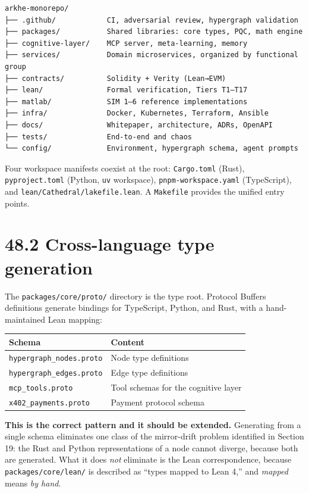 \documentclass[
  11pt]{report}
\begin{document}
\begin{verbatim}
arkhe-monorepo/
├── .github/            CI, adversarial review, hypergraph validation
├── packages/           Shared libraries: core types, PQC, math engine
├── cognitive-layer/    MCP server, meta-learning, memory
├── services/           Domain microservices, organized by functional group
├── contracts/          Solidity + Verity (Lean→EVM)
├── lean/               Formal verification, Tiers T1–T17
├── matlab/             SIM 1–6 reference implementations
├── infra/              Docker, Kubernetes, Terraform, Ansible
├── docs/               Whitepaper, architecture, ADRs, OpenAPI
├── tests/              End-to-end and chaos
└── config/             Environment, hypergraph schema, agent prompts
\end{verbatim}

Four workspace manifests coexist at the root: \texttt{Cargo.toml}
(Rust), \texttt{pyproject.toml} (Python, \texttt{uv} workspace),
\texttt{pnpm-workspace.yaml} (TypeScript), and
\texttt{lean/Cathedral/lakefile.lean}. A \texttt{Makefile} provides the
unified entry points.

\hypertarget{cross-language-type-generation}{%
\section{48.2 Cross-language type
generation}\label{cross-language-type-generation}}

The \texttt{packages/core/proto/} directory is the type root. Protocol
Buffers definitions generate bindings for TypeScript, Python, and Rust,
with a hand-maintained Lean mapping:

\begin{longtable}[]{@{}ll@{}}
\toprule\noalign{}
Schema & Content \\
\midrule\noalign{}
\endhead
\bottomrule\noalign{}
\endlastfoot
\texttt{hypergraph\_nodes.proto} & Node type definitions \\
\texttt{hypergraph\_edges.proto} & Edge type definitions \\
\texttt{mcp\_tools.proto} & Tool schemas for the cognitive layer \\
\texttt{x402\_payments.proto} & Payment protocol schema \\
\end{longtable}

\textbf{This is the correct pattern and it should be extended.}
Generating from a single schema eliminates one class of the mirror-drift
problem identified in Section 19: the Rust and Python representations of
a node cannot diverge, because both are generated. What it does
\emph{not} eliminate is the Lean correspondence, because
\texttt{packages/core/lean/} is described as ``types mapped to Lean 4,''
and \emph{mapped} means \emph{by hand}.
\end{document}
